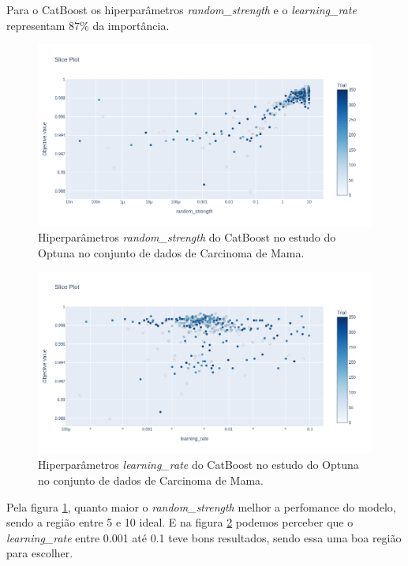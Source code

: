 Para o CatBoost os hiperparâmetros \textit{random\_strength} e o \textit{learning\_rate} representam 87\% da importância.
\begin{figure}[H]
 \caption{Hiperparâmetros \textit{random\_strength} do CatBoost no estudo do Optuna no conjunto de dados de Carcinoma de Mama.}
 \label{fig:op:cancer:rad:cat}
 \centering
 \includegraphics[scale=0.3]{images/optuna_catboost_random_cancer.png}
\end{figure}
\begin{figure}[H]
 \caption{Hiperparâmetros \textit{learning\_rate} do CatBoost no estudo do Optuna no conjunto de dados de Carcinoma de Mama.}
 \label{fig:op:cancer:len:cat}
 \centering
 \includegraphics[scale=0.3]{images/optuna_catboost_learning_cancer.png}
\end{figure}
Pela figura \ref{fig:op:cancer:rad:cat}, quanto maior o \textit{random\_strength} melhor a perfomance do modelo, sendo a região entre 5 e 10 ideal. E na figura \ref{fig:op:cancer:len:cat} podemos perceber que o \textit{learning\_rate} entre 0.001 até 0.1 teve bons resultados, sendo essa uma boa região para escolher.

